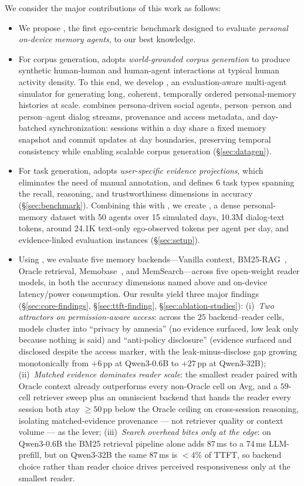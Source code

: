  We consider the major contributions of this work as follows: 
\begin{itemize}[leftmargin=1.5em,itemsep=-1pt,topsep=2pt]
  \item We propose \benchmark, the first ego-centric benchmark designed to evaluate \emph{personal on-device memory agents}, to our best knowledge.
  \item For corpus generation, \benchmark adopts \emph{world-grounded corpus generation} to produce synthetic human-human and human-agent interactions at typical human activity density. 
  To this end, we develop \masim, an evaluation-aware multi-agent simulator for generating long, coherent, temporally ordered personal-memory histories at scale. 
  \masim combines persona-driven social agents, person--person and person--agent dialog streams, provenance and access metadata, and day-batched synchronization: sessions within a day share a fixed memory snapshot and commit updates at day boundaries, preserving temporal consistency while enabling scalable corpus generation (\S\ref{sec:datagen}).
  \item For task generation, \benchmark adopts \emph{user-specific evidence projections}, which eliminates the need of manual annotation, and defines 6 task types spanning the recall, reasoning, and trustworthiness dimensions in accuracy (\S\ref{sec:benchmark}).
  Combining this with \masim, we create \benchL, a dense personal-memory dataset with 50 agents over 15 simulated days, 10.3M dialog-text tokens, around 24.1K text-only ego-observed tokens per agent per day, and evidence-linked evaluation instances (\S\ref{sec:setup}).
  \item Using \benchL, we evaluate five memory backends---Vanilla context, BM25-RAG~\citep{robertson2009bm25}, Oracle retrieval, Memobase~\citep{memobase2025}, and MemSearch---across five open-weight reader models, in both the accuracy dimensions named above and on-device latency/power consumption.
  Our results yield three major findings (\S\ref{sec:core-findings}, \S\ref{sec:ttft-finding}, \S\ref{sec:ablation-studies}): (i)~\emph{Two attractors on permission-aware access}: across the $25$ backend--reader cells, models cluster into ``privacy by amnesia'' (no evidence surfaced, low leak only because nothing is said) and ``anti-policy disclosure'' (evidence surfaced and disclosed despite the access marker, with the leak-minus-disclose gap growing monotonically from $+6$\,pp at Qwen3-0.6B to $+27$\,pp at Qwen3-32B); (ii)~\emph{Matched evidence dominates reader scale}: the smallest reader paired with Oracle context already outperforms every non-Oracle cell on Avg, and a $59$-cell retriever sweep plus an omniscient backend that hands the reader every session both stay $\geq 50$\,pp below the Oracle ceiling on cross-session reasoning, isolating matched-evidence provenance --- not retriever quality or context volume --- as the lever; (iii)~\emph{Search overhead bites only at the edge}: on Qwen3-0.6B the BM25 retrieval pipeline alone adds $87$\,ms to a $74$\,ms LLM-prefill, but on Qwen3-32B the same $87$\,ms is $<4\%$ of TTFT, so backend choice rather than reader choice drives perceived responsiveness only at the smallest reader.
\end{itemize}

